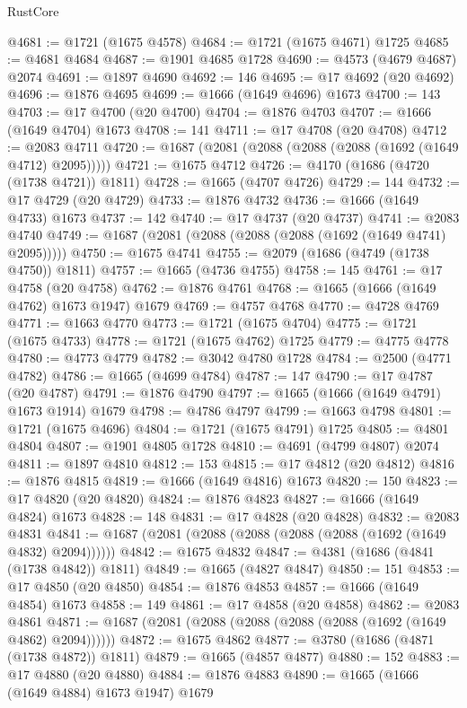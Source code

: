 \begin{lexlean}{RustCore}
\begin{coremodule}
@4681 := @1721 (@1675 @4578)
@4684 := @1721 (@1675 @4671) @1725
@4685 := @4681 @4684
@4687 := @1901 @4685 @1728
@4690 := @4573 (@4679 @4687) @2074
@4691 := @1897 @4690
@4692 := 146
@4695 := @17 @4692 (@20 @4692)
@4696 := @1876 @4695
@4699 := @1666 (@1649 @4696) @1673
@4700 := 143
@4703 := @17 @4700 (@20 @4700)
@4704 := @1876 @4703
@4707 := @1666 (@1649 @4704) @1673
@4708 := 141
@4711 := @17 @4708 (@20 @4708)
@4712 := @2083 @4711
@4720 := @1687 (@2081 (@2088 (@2088 (@2088 (@1692 (@1649 @4712) @2095)))))
@4721 := @1675 @4712
@4726 := @4170 (@1686 (@4720 (@1738 @4721)) @1811)
@4728 := @1665 (@4707 @4726)
@4729 := 144
@4732 := @17 @4729 (@20 @4729)
@4733 := @1876 @4732
@4736 := @1666 (@1649 @4733) @1673
@4737 := 142
@4740 := @17 @4737 (@20 @4737)
@4741 := @2083 @4740
@4749 := @1687 (@2081 (@2088 (@2088 (@2088 (@1692 (@1649 @4741) @2095)))))
@4750 := @1675 @4741
@4755 := @2079 (@1686 (@4749 (@1738 @4750)) @1811)
@4757 := @1665 (@4736 @4755)
@4758 := 145
@4761 := @17 @4758 (@20 @4758)
@4762 := @1876 @4761
@4768 := @1665 (@1666 (@1649 @4762) @1673 @1947) @1679
@4769 := @4757 @4768
@4770 := @4728 @4769
@4771 := @1663 @4770
@4773 := @1721 (@1675 @4704)
@4775 := @1721 (@1675 @4733)
@4778 := @1721 (@1675 @4762) @1725
@4779 := @4775 @4778
@4780 := @4773 @4779
@4782 := @3042 @4780 @1728
@4784 := @2500 (@4771 @4782)
@4786 := @1665 (@4699 @4784)
@4787 := 147
@4790 := @17 @4787 (@20 @4787)
@4791 := @1876 @4790
@4797 := @1665 (@1666 (@1649 @4791) @1673 @1914) @1679
@4798 := @4786 @4797
@4799 := @1663 @4798
@4801 := @1721 (@1675 @4696)
@4804 := @1721 (@1675 @4791) @1725
@4805 := @4801 @4804
@4807 := @1901 @4805 @1728
@4810 := @4691 (@4799 @4807) @2074
@4811 := @1897 @4810
@4812 := 153
@4815 := @17 @4812 (@20 @4812)
@4816 := @1876 @4815
@4819 := @1666 (@1649 @4816) @1673
@4820 := 150
@4823 := @17 @4820 (@20 @4820)
@4824 := @1876 @4823
@4827 := @1666 (@1649 @4824) @1673
@4828 := 148
@4831 := @17 @4828 (@20 @4828)
@4832 := @2083 @4831
@4841 := @1687 (@2081 (@2088 (@2088 (@2088 (@2088 (@1692 (@1649 @4832) @2094))))))
@4842 := @1675 @4832
@4847 := @4381 (@1686 (@4841 (@1738 @4842)) @1811)
@4849 := @1665 (@4827 @4847)
@4850 := 151
@4853 := @17 @4850 (@20 @4850)
@4854 := @1876 @4853
@4857 := @1666 (@1649 @4854) @1673
@4858 := 149
@4861 := @17 @4858 (@20 @4858)
@4862 := @2083 @4861
@4871 := @1687 (@2081 (@2088 (@2088 (@2088 (@2088 (@1692 (@1649 @4862) @2094))))))
@4872 := @1675 @4862
@4877 := @3780 (@1686 (@4871 (@1738 @4872)) @1811)
@4879 := @1665 (@4857 @4877)
@4880 := 152
@4883 := @17 @4880 (@20 @4880)
@4884 := @1876 @4883
@4890 := @1665 (@1666 (@1649 @4884) @1673 @1947) @1679

\end{coremodule}
\end{lexlean}
